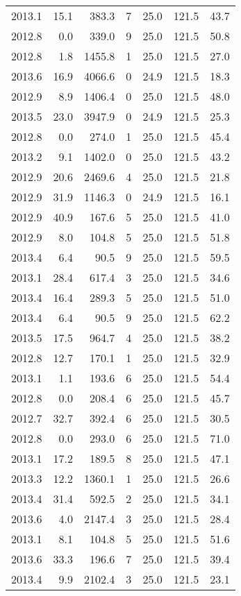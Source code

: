 \begin{tabular}{rrrrrrr}
2013.1 & 15.1 & 383.3 & 7 & 25.0 & 121.5 & 43.7 \\
2012.8 & 0.0 & 339.0 & 9 & 25.0 & 121.5 & 50.8 \\
2012.8 & 1.8 & 1455.8 & 1 & 25.0 & 121.5 & 27.0 \\
2013.6 & 16.9 & 4066.6 & 0 & 24.9 & 121.5 & 18.3 \\
2012.9 & 8.9 & 1406.4 & 0 & 25.0 & 121.5 & 48.0 \\
2013.5 & 23.0 & 3947.9 & 0 & 24.9 & 121.5 & 25.3 \\
2012.8 & 0.0 & 274.0 & 1 & 25.0 & 121.5 & 45.4 \\
2013.2 & 9.1 & 1402.0 & 0 & 25.0 & 121.5 & 43.2 \\
2012.9 & 20.6 & 2469.6 & 4 & 25.0 & 121.5 & 21.8 \\
2012.9 & 31.9 & 1146.3 & 0 & 24.9 & 121.5 & 16.1 \\
2012.9 & 40.9 & 167.6 & 5 & 25.0 & 121.5 & 41.0 \\
2012.9 & 8.0 & 104.8 & 5 & 25.0 & 121.5 & 51.8 \\
2013.4 & 6.4 & 90.5 & 9 & 25.0 & 121.5 & 59.5 \\
2013.1 & 28.4 & 617.4 & 3 & 25.0 & 121.5 & 34.6 \\
2013.4 & 16.4 & 289.3 & 5 & 25.0 & 121.5 & 51.0 \\
2013.4 & 6.4 & 90.5 & 9 & 25.0 & 121.5 & 62.2 \\
2013.5 & 17.5 & 964.7 & 4 & 25.0 & 121.5 & 38.2 \\
2012.8 & 12.7 & 170.1 & 1 & 25.0 & 121.5 & 32.9 \\
2013.1 & 1.1 & 193.6 & 6 & 25.0 & 121.5 & 54.4 \\
2012.8 & 0.0 & 208.4 & 6 & 25.0 & 121.5 & 45.7 \\
2012.7 & 32.7 & 392.4 & 6 & 25.0 & 121.5 & 30.5 \\
2012.8 & 0.0 & 293.0 & 6 & 25.0 & 121.5 & 71.0 \\
2013.1 & 17.2 & 189.5 & 8 & 25.0 & 121.5 & 47.1 \\
2013.3 & 12.2 & 1360.1 & 1 & 25.0 & 121.5 & 26.6 \\
2013.4 & 31.4 & 592.5 & 2 & 25.0 & 121.5 & 34.1 \\
2013.6 & 4.0 & 2147.4 & 3 & 25.0 & 121.5 & 28.4 \\
2013.1 & 8.1 & 104.8 & 5 & 25.0 & 121.5 & 51.6 \\
2013.6 & 33.3 & 196.6 & 7 & 25.0 & 121.5 & 39.4 \\
2013.4 & 9.9 & 2102.4 & 3 & 25.0 & 121.5 & 23.1 \\

\end{tabular}

